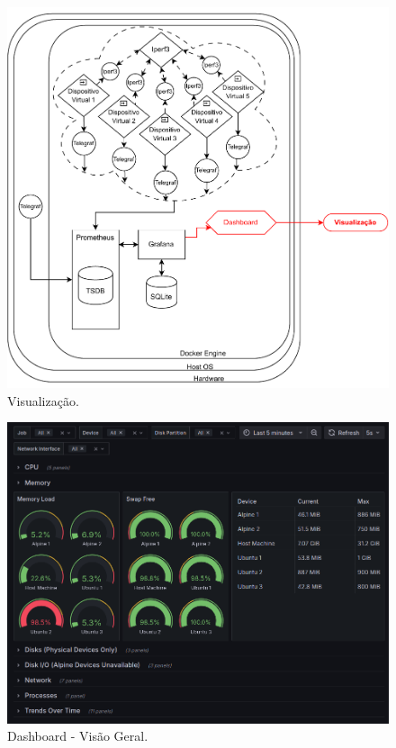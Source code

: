 \begin{figure}[ht]
\centering
\setlength{\abovecaptionskip}{-20pt}
\includegraphics[width=\textwidth]{Imagens/chap04/by-blocks/dashboard_diagram.pdf}
\caption{Visualização.}
\label{fig:DiagramaVisualizacao}
\end{figure}

\begin{figure}[H]
\centering
\setlength{\abovecaptionskip}{-20pt}
\includegraphics[width=\textwidth]{Imagens/chap04/dashboard/home.png}
\caption{Dashboard - Visão Geral.}
\label{fig:dashboard-home}
\end{figure}

